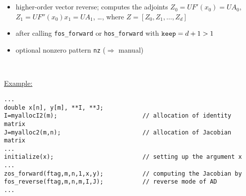 \documentclass[12pt,oneside,a4paper]{article}
\begin{document}
\begin{center}
\begin{minipage}[h]{14cm}
\end{minipage}\\[2ex]
%
\\[2ex]
\begin{minipage}[h]{14cm}
\small 
\begin{itemize}
\item higher-order vector reverse; computes the adjoints
      \mbox{$Z_0=U F'\left(x_0\right)=U A_0$},
      \mbox{$Z_1=U F''\left(x_0\right)x_1=U A_1$}, 
      \ldots, where $Z=[Z_0,Z_1,\ldots,Z_d]$
\item after calling  {\tt fos\_forward} or 
      {\tt hos\_forward} with $\text{\tt keep}=d+1>1$
\item optional nonzero pattern {\tt nz} ($\Rightarrow$ manual)
\end{itemize}
\end{minipage}\\[3ex]
%
\begin{minipage}[h]{160mm}
\small
\underline{Example:}
\begin{verbatim}
...
double x[n], y[m], **I, **J;
I=myallocI2(m);                        // allocation of identity matrix
J=myalloc2(m,n);                       // allocation of Jacobian matrix
...
initialize(x);                         // setting up the argument x
...
zos_forward(ftag,m,n,1,x,y);           // computing the Jacobian by
fos_reverse(ftag,m,n,m,I,J);           // reverse mode of AD
...
\end{verbatim}
\end{minipage}
\end{center}
\end{document}
